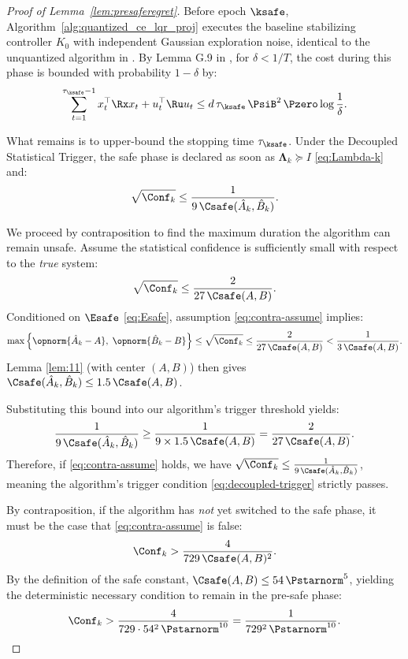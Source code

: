 \documentclass[11pt,journal,onecolumn]{IEEEtran}
\begin{document}
\begin{proof}[Proof of Lemma~\ref{lem:presaferegret}]
    Before epoch $\ksafe$, Algorithm~\ref{alg:quantized_ce_lqr_proj} executes the baseline stabilizing controller $K_0$ with independent Gaussian exploration noise, identical to the unquantized algorithm in \cite{simchowitz20a}. By Lemma G.9 in \cite{simchowitz20a}, for $\delta < 1/T$, the cost during this phase is bounded with probability $1 - \delta$ by:
    \begin{equation}
        \label{presaferegret}
        \sum_{t=1}^{\tau_{\ksafe}-1} x_{t}^\top \Rx x_{t} + u_{t}^\top \Ru u_{t} \le d\,\tau_{\ksafe}\,\PsiB^2\, \Pzero \log\frac{1}{\delta}.
    \end{equation}

    What remains is to upper-bound the stopping time $\tau_{\ksafe}$. Under the Decoupled Statistical Trigger, the safe phase is declared as soon as $\mathbf{\Lambda}_k \succeq I$ \eqref{eq:Lambda-k} and:
    \begin{equation}
        \label{eq:decoupled-trigger}
        \sqrt{\Conf_k} \le \frac{1}{9\,\Csafe(\hat A_k, \hat B_k)}.
    \end{equation}

    We proceed by contraposition to find the maximum duration the algorithm can remain unsafe. Assume the statistical confidence is sufficiently small with respect to the \emph{true} system:
    \begin{equation}
        \label{eq:contra-assume}
        \sqrt{\Conf_k} \le \frac{2}{27\,\Csafe(A, B)}.
    \end{equation}
    Conditioned on $\Esafe$ \eqref{eq:Esafe}, assumption \eqref{eq:contra-assume} implies:
    \[
        \max\left\{\opnorm{\hat A_k - A},\;\opnorm{\hat B_k - B}\right\} \le \sqrt{\Conf_k} \le \frac{2}{27\,\Csafe(A, B)} < \frac{1}{3\,\Csafe(A, B)}.
    \]
    Lemma \ref{lem:11} (with center $(A, B)$) then gives $\Csafe(\hat A_k, \hat B_k) \le 1.5\,\Csafe(A, B)$.

    Substituting this bound into our algorithm's trigger threshold yields:
    \[
        \frac{1}{9\,\Csafe(\hat A_k, \hat B_k)} \ge \frac{1}{9 \times 1.5\,\Csafe(A, B)} = \frac{2}{27\,\Csafe(A, B)}.
    \]
    Therefore, if \eqref{eq:contra-assume} holds, we have $\sqrt{\Conf_k} \le \frac{1}{9\,\Csafe(\hat A_k, \hat B_k)}$, meaning the algorithm's trigger condition \eqref{eq:decoupled-trigger} strictly passes.

    By contraposition, if the algorithm has \emph{not} yet switched to the safe phase, it must be the case that \eqref{eq:contra-assume} is false:
    \[
        \Conf_k > \frac{4}{729\,\Csafe(A, B)^2}.
    \]
    By the definition of the safe constant, $\Csafe(A, B) \le 54\,\Pstarnorm^5$, yielding the deterministic necessary condition to remain in the pre-safe phase:
    \begin{equation}
        \label{eq:conf-lower-bound}
        \Conf_k > \frac{4}{729 \cdot 54^2\,\Pstarnorm^{10}} = \frac{1}{729^2 \,\Pstarnorm^{10}}.
    \end{equation}


\end{proof}
\end{document}

